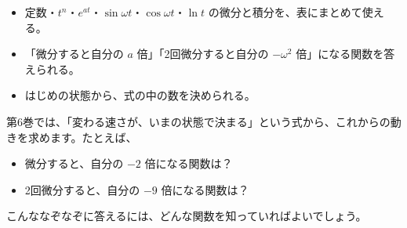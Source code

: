 \newcommand\bkvromidashi[1]{\par\Needspace{6\baselineskip}\noindent\textbf{#1}\par}

\begin{goal}
\begin{itemize}[label={\color{bkTheme}●}, leftmargin=1.6\zw, itemsep=0pt, topsep=1pt]
\item {}\enspace 定数・$t^n$・$e^{at}$・$\sin\omega t$・$\cos\omega t$・$\ln t$ の微分と積分を、表にまとめて使える。
\item {}\enspace 「微分すると自分の $a$ 倍」「2回微分すると自分の $-\omega^2$ 倍」になる関数を答えられる。
\item {}\enspace はじめの状態から、式の中の数を決められる。
\end{itemize}
\end{goal}

\begin{hatena}
\noindent\begin{minipage}[c]{0.58\linewidth}
第6巻では、「変わる速さが、いまの状態で決まる」という式から、これからの動きを求めます。たとえば、
\begin{itemize}[leftmargin=1.2\zw, itemsep=0pt, topsep=2pt, label={\color{bkYellow!70!black}●}]
\item 微分すると、自分の $-2$ 倍になる関数は？
\item 2回微分すると、自分の $-9$ 倍になる関数は？
\end{itemize}
こんななぞなぞに答えるには、どんな関数を知っていればよいでしょう。
\end{minipage}\hfill
\begin{minipage}[c]{0.38\linewidth}
\centering
{}
\end{minipage}
\end{hatena}

